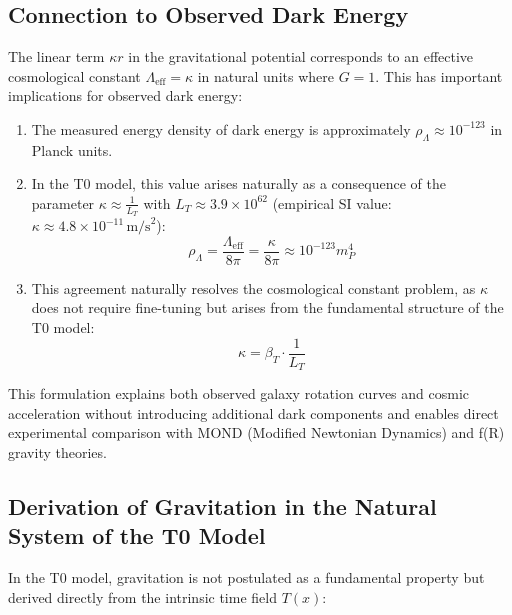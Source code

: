 \documentclass[12pt,a4paper]{article}
\begin{document}
	\subsection*{Connection to Observed Dark Energy}

The linear term $\kappa r$ in the gravitational potential corresponds to an effective cosmological constant $\Lambda_{\text{eff}} = \kappa$ in natural units where \(G = 1\). This has important implications for observed dark energy:
\begin{enumerate}
	\item The measured energy density of dark energy is approximately $\rho_\Lambda \approx 10^{-123}$ in Planck units.
	
	\item In the T0 model, this value arises naturally as a consequence of the parameter $\kappa \approx \frac{1}{L_T}$ with \(L_T \approx 3.9 \times 10^{62}\) (empirical SI value: \(\kappa \approx 4.8 \times 10^{-11} \, \text{m/s}^2\)):
	\[
	\rho_\Lambda = \frac{\Lambda_{\text{eff}}}{8\pi} = \frac{\kappa}{8\pi} \approx 10^{-123} m_P^4
	\]
	
	\item This agreement naturally resolves the cosmological constant problem, as $\kappa$ does not require fine-tuning but arises from the fundamental structure of the T0 model:
	\[
	\kappa = \beta_T \cdot \frac{1}{L_T}
	\]
\end{enumerate}

	
	This formulation explains both observed galaxy rotation curves and cosmic acceleration without introducing additional dark components and enables direct experimental comparison with MOND (Modified Newtonian Dynamics) and f(R) gravity theories.
	
	\subsection*{Derivation of Gravitation in the Natural System of the T0 Model}
	
	In the T0 model, gravitation is not postulated as a fundamental property but derived directly from the intrinsic time field $T(x)$:
	
\end{document}
